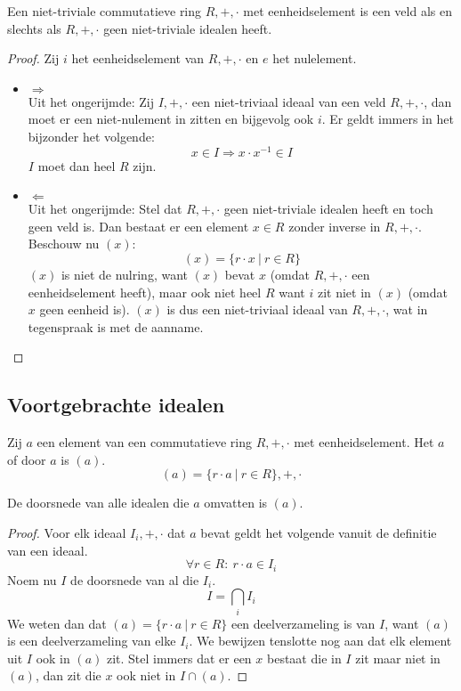 \documentclass[main.tex]{subfiles}
\begin{document}
\begin{st}
  Een niet-triviale commutatieve ring $R,+,\cdot$ met eenheidselement is een veld als en slechts als $R,+,\cdot$ geen niet-triviale idealen heeft.

  \begin{proof}
    Zij $i$ het eenheidselement van $R,+,\cdot$ en $e$ het nulelement.
    \begin{itemize}
    \item $\Rightarrow$\\
      Uit het ongerijmde:
      Zij $I,+,\cdot$ een niet-triviaal ideaal van een veld $R,+,\cdot$, dan moet er een niet-nulement in zitten en bijgevolg ook $i$.
      Er geldt immers in het bijzonder het volgende:
      \[ x \in I \Rightarrow x \cdot x^{-1} \in I \]
      $I$ moet dan heel $R$ zijn.
    \item $\Leftarrow$\\
      Uit het ongerijmde:
      Stel dat $R,+,\cdot$ geen niet-triviale idealen heeft en toch geen veld is.
      Dan bestaat er een element $x\in R$ zonder inverse in $R,+,\cdot$.
      Beschouw nu $(x)$:
      \[ (x) = \{ r\cdot x \ |\ r \in R \} \]
      $(x)$ is niet de nulring, want $(x)$ bevat $x$ (omdat $R,+,\cdot$ een eenheidselement heeft), maar ook niet heel $R$ want $i$ zit niet in $(x)$ (omdat $x$ geen eenheid is).
      $(x)$ is dus een niet-triviaal ideaal van $R,+,\cdot$, wat in tegenspraak is met de aanname.
    \end{itemize}
  \end{proof}
\end{st}

\subsection{Voortgebrachte idealen}

\begin{de}
  Zij $a$ een element van een commutatieve ring $R,+,\cdot$ met eenheidselement.
  Het  $a$ of  door $a$ is $(a)$.
  \[ (a) = \{r \cdot a \ |\ r \in R \},+,\cdot \]
\end{de}

\begin{st}
  De doorsnede van alle idealen die $a$ omvatten is $(a)$.

  \begin{proof}
    Voor elk ideaal $I_{i},+,\cdot$ dat $a$ bevat geldt het volgende vanuit de definitie van een ideaal.
    \[ \forall r\in R:\ r\cdot a \in I_{i}\]
    Noem nu $I$ de doorsnede van al die $I_{i}$.
    \[ I = \bigcap_{i}I_{i}\]
    We weten dan dat $(a) = \{r \cdot a \ |\ r \in R \}$ een deelverzameling is van $I$, want $(a)$ is een deelverzameling van elke $I_{i}$.
    We bewijzen tenslotte nog aan dat elk element uit $I$ ook in $(a)$ zit.
    Stel immers dat er een $x$ bestaat die in $I$ zit maar niet in $(a)$, dan zit die $x$ ook niet in $I \cap (a)$.
  \end{proof}
\end{st}
\end{document}

